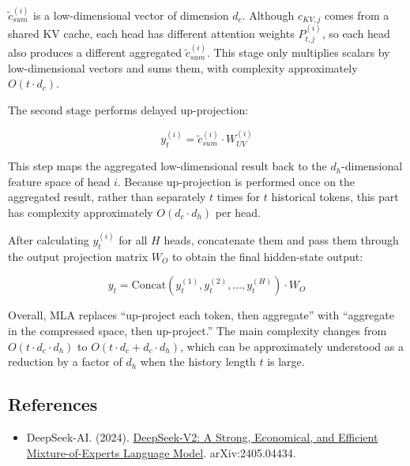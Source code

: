 \(\tilde c_{sum}^{(i)}\) is a low-dimensional vector of dimension \(d_c\). Although \(c_{KV,j}\) comes from a shared KV cache, each head has different attention weights \(P_{t,j}^{(i)}\), so each head also produces a different aggregated \(\tilde c_{sum}^{(i)}\). This stage only multiplies scalars by low-dimensional vectors and sums them, with complexity approximately \(O(t \cdot d_c)\).

The second stage performs delayed up-projection:

\[
y_t^{(i)} = \tilde c_{sum}^{(i)} \cdot W_{UV}^{(i)}
\]

This step maps the aggregated low-dimensional result back to the \(d_h\)-dimensional feature space of head \(i\). Because up-projection is performed once on the aggregated result, rather than separately \(t\) times for \(t\) historical tokens, this part has complexity approximately \(O(d_c \cdot d_h)\) per head.

After calculating \(y_t^{(i)}\) for all \(H\) heads, concatenate them and pass them through the output projection matrix \(W_O\) to obtain the final hidden-state output:

\[
y_t
=
\mathrm{Concat}\left(y_t^{(1)}, y_t^{(2)}, \ldots, y_t^{(H)}\right) \cdot W_O
\]

Overall, MLA replaces ``up-project each token, then aggregate'' with ``aggregate in the compressed space, then up-project.'' The main complexity changes from \(O(t \cdot d_c \cdot d_h)\) to \(O(t \cdot d_c + d_c \cdot d_h)\), which can be approximately understood as a reduction by a factor of \(d_h\) when the history length \(t\) is large.

\FloatBarrier
{}
\hypertarget{references-95}{%
\subsection{References}\label{references-95}}

\vspace{0.25em}
\begin{itemize}
\tightlist
\item
  DeepSeek-AI. (2024). \href{https://arxiv.org/abs/2405.04434}{DeepSeek-V2: A Strong, Economical, and Efficient Mixture-of-Experts Language Model}. arXiv:2405.04434.
\end{itemize}

\clearpage
